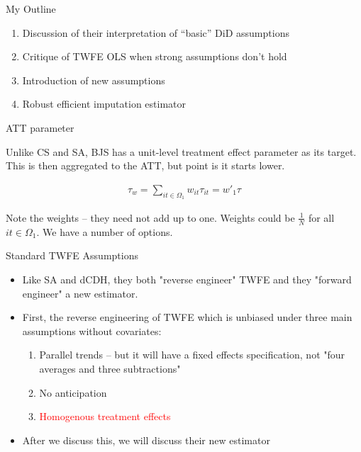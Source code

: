 \documentclass{beamer}
\begin{document}
\begin{frame}{My Outline}

\begin{enumerate}
\item Discussion of their interpretation of ``basic'' DiD assumptions
\item Critique of TWFE OLS when strong assumptions don't hold
\item Introduction of new assumptions
\item Robust efficient imputation estimator
\end{enumerate}

\end{frame}


\begin{frame}{ATT parameter}

Unlike CS and SA, BJS has a unit-level treatment effect parameter as its target.  This is then aggregated to the ATT, but point is it starts lower.

\begin{eqnarray*}
\tau_w = \sum_{it \in \Omega_{1}}w_{it}\tau_{it} = w'_1\tau
\end{eqnarray*}

\bigskip

Note the weights -- they need not add up to one.  Weights could be $\frac{1}{N}$ for all $it \in \Omega_1$. We have a number of options. 


\end{frame}

\begin{frame}{Standard TWFE Assumptions}


\begin{itemize}
\item Like SA and dCDH, they both "reverse engineer" TWFE and they "forward engineer" a new estimator. 
\item First, the reverse engineering of TWFE which is unbiased under three main assumptions without covariates:
\begin{enumerate}
\item Parallel trends -- but it will have a fixed effects specification, not "four averages and three subtractions"
\item No anticipation
\item \textcolor{red}{Homogenous treatment effects}
\end{enumerate}
\item After we discuss this, we will discuss their new estimator
\end{itemize}

\end{frame}
\end{document}
